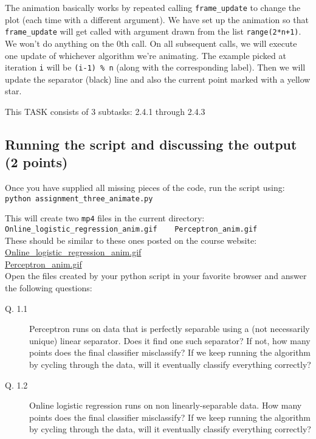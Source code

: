 \documentclass{article}
\begin{document}
The animation basically works by repeated calling {\tt frame\_update} to change the plot (each time with a different argument).
We have set up the animation so that {\tt frame\_update} will get called with argument drawn from the list {\tt range(2*n+1)}.
We won't do anything on the $0$th call. On all subsequent calls, we will execute one update of whichever algorithm we're animating.
The example picked at iteration {\tt i} will be {\tt (i-1) \% n} (along with the corresponding label). 
Then we will update the separator (black) line and also the current point marked with a yellow star.

This TASK consists of 3 subtasks: 2.4.1 through 2.4.3

\subsection{Running the script and discussing the output (2 points)}

Once you have supplied all missing pieces of the code, run the script using:\\
{\tt python assignment\_three\_animate.py}

This will create two {\tt mp4} files in the current directory:\\
\verb#Online_logistic_regression_anim.gif    Perceptron_anim.gif#\\
These should be similar to these ones posted on the course website:\\
\href{http://dept.stat.lsa.umich.edu/~tewaria/teaching/STATS607A-Fall2015/Online_logistic_regression_anim.gif}{Online\_logistic\_regression\_anim.gif}\\
\href{http://dept.stat.lsa.umich.edu/~tewaria/teaching/STATS607A-Fall2015/Perceptron_anim.gif}{Perceptron\_anim.gif}\\
Open the files created by your python script in your favorite browser and
answer the following questions:
\begin{description}
\item[Q. 1.1]
Perceptron runs on data that is perfectly separable using a (not necessarily unique) linear separator. Does it find one such separator?
If not, how many points does the final classifier misclassify? If we keep running the algorithm by cycling through the data, will it eventually classify everything correctly?
\item[Q. 1.2]
Online logistic regression runs on non linearly-separable data. How many points does the final classifier misclassify? 
If we keep running the algorithm by cycling through the data, will it eventually classify everything correctly?  
\end{description}
\end{document}
